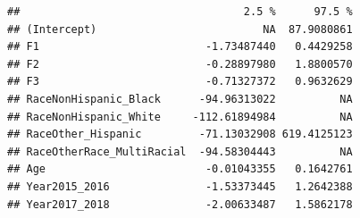 \documentclass[
]{article}
\begin{document}
\begin{verbatim}
##                                   2.5 %      97.5 %
## (Intercept)                          NA  87.9080861
## F1                          -1.73487440   0.4429258
## F2                          -0.28897980   1.8800570
## F3                          -0.71327372   0.9632629
## RaceNonHispanic_Black      -94.96313022          NA
## RaceNonHispanic_White     -112.61894984          NA
## RaceOther_Hispanic         -71.13032908 619.4125123
## RaceOtherRace_MultiRacial  -94.58304443          NA
## Age                         -0.01043355   0.1642761
## Year2015_2016               -1.53373445   1.2642388
## Year2017_2018               -2.00633487   1.5862178
\end{verbatim}
\end{document}
